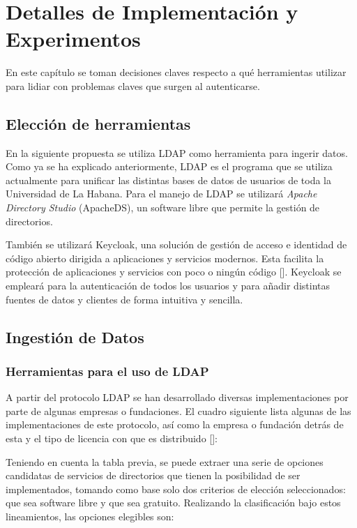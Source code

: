 \chapter{Detalles de Implementación y Experimentos}\label{chapter:implementation}

En este capítulo se toman decisiones claves respecto a qué herramientas utilizar para lidiar con problemas claves que surgen al autenticarse.

\section*{Elección de herramientas}
En la siguiente propuesta se utiliza LDAP como herramienta para ingerir datos. Como ya se ha explicado anteriormente, LDAP es el programa que se utiliza actualmente para unificar las distintas bases de datos de usuarios de toda la Universidad de La Habana. Para el manejo de LDAP se utilizará \textit{Apache Directory Studio} (ApacheDS), un software libre que permite la gestión de directorios.

También se utilizará Keycloak, una solución de gestión de acceso e identidad de código abierto dirigida a aplicaciones y servicios modernos. Esta facilita la protección de aplicaciones y servicios con poco o ningún código [\cite{muyon2020metodos}]. Keycloak se empleará para la autenticación de todos los usuarios y para añadir distintas fuentes de datos y clientes de forma intuitiva y sencilla.

\section*{Ingestión de Datos}

\subsection*{Herramientas para el uso de LDAP}

A partir del protocolo LDAP se han desarrollado diversas implementaciones por parte de algunas empresas o fundaciones. El cuadro siguiente lista algunas de las implementaciones de este protocolo, así como la empresa o fundación detrás de esta y el tipo de licencia con que es distribuido [\cite{gonzalez2010implementacion}]:



Teniendo en cuenta la tabla previa, se puede extraer una serie de opciones candidatas de servicios de directorios que tienen la posibilidad de ser implementados, tomando como base solo dos criterios de elección seleccionados: que sea software libre y que sea gratuito. Realizando la clasificación bajo estos
lineamientos, las opciones elegibles son:

